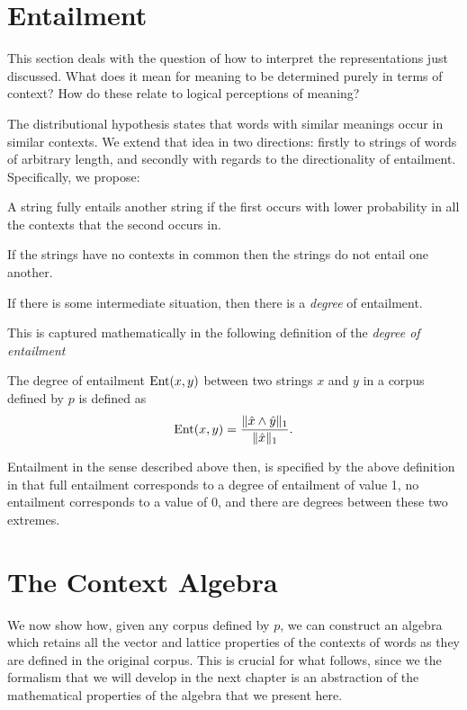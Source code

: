 \documentclass[12pt]{report}
\begin{document}


\section{Entailment}

This section deals with the question of how to interpret the representations just discussed. What does it mean for meaning to be determined purely in terms of context? How do these relate to logical perceptions of meaning?

The distributional hypothesis states that words with similar meanings occur in similar contexts. We extend that idea in two directions: firstly to strings of words of arbitrary length, and secondly with regards to the directionality of entailment. Specifically, we propose:
\begin{assumption} A string fully entails another string if the first occurs with lower probability in all the contexts that the second occurs in.\end{assumption}
\begin{assumption} If the strings have no contexts in common then the strings do not entail one another.\end{assumption}
\begin{assumption} If there is some intermediate situation, then there is a \emph{degree} of entailment.\end{assumption}\noindent
This is captured mathematically in the following definition of the \emph{degree of entailment}
\begin{defn}
The degree of entailment $\operatorname{Ent}(x,y)$ between two strings $x$ and $y$ in a corpus defined by $p$ is defined as
$$\operatorname{Ent}(x,y) = \frac{\|\hat{x}\land\hat{y}\|_1}{\|\hat{x}\|_1}.$$
\end{defn}
Entailment in the sense described above then, is specified by the above definition in that full entailment corresponds to a degree of entailment of value 1, no entailment corresponds to a value of 0, and there are degrees between these two extremes.

\section{The Context Algebra}

We now show how, given any corpus defined by $p$, we can construct an algebra which retains all the vector and lattice properties of the contexts of words as they are defined in the original corpus. This is crucial for what follows, since we the formalism that we will develop in the next chapter is an abstraction of the mathematical properties of the algebra that we present here.
\end{document}
